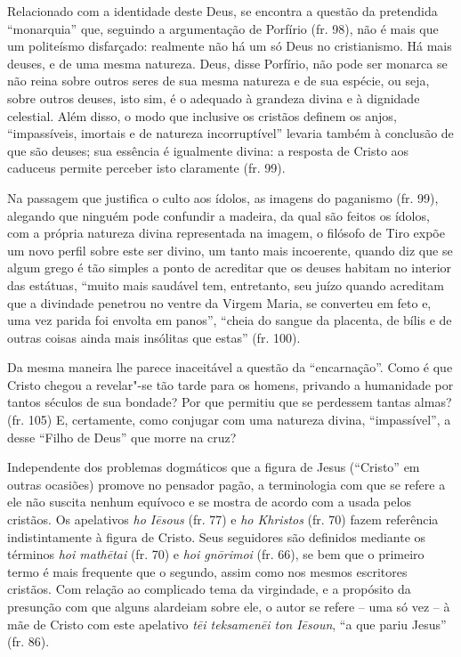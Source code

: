 Relacionado com a identidade deste Deus, se encontra a questão da
pretendida “monarquia” que, seguindo a argumentação de Porfírio (fr.
98), não é mais que um politeísmo disfarçado: realmente não há um só
Deus no cristianismo. Há mais deuses, e de uma mesma natureza. Deus,
disse Porfírio, não pode ser monarca se não reina sobre outros seres de
sua mesma natureza e de sua espécie, ou seja, sobre outros deuses, isto
sim, é o adequado à grandeza divina e à dignidade celestial. Além
disso, o modo que inclusive os cristãos definem os anjos, “impassíveis,
imortais e de natureza incorruptível”
levaria também  à conclusão de que são deuses; sua essência é igualmente
divina: a resposta de Cristo aos caduceus permite perceber isto
claramente (fr. 99). 

Na passagem que justifica o culto aos ídolos, as imagens do paganismo
(fr. 99), alegando que ninguém pode confundir a madeira, da qual são
feitos os ídolos, com a própria natureza divina representada na imagem,
o filósofo de Tiro expõe um novo perfil sobre este ser divino, um tanto
mais incoerente, quando diz que se algum grego é tão simples a ponto de
acreditar que os deuses habitam no interior das estátuas, “muito mais
saudável tem, entretanto, seu juízo quando acreditam que a divindade
penetrou no ventre da Virgem Maria, se converteu em feto e, uma vez
parida foi envolta em panos”,
“cheia do sangue da placenta, de bílis e de outras coisas ainda mais
insólitas que estas” (fr. 100).  

Da mesma maneira lhe parece inaceitável a questão da “encarnação”. Como
é que Cristo chegou a revelar"-se tão tarde para os homens, privando a
humanidade por tantos séculos de sua bondade? Por que permitiu que se
perdessem tantas almas? (fr. 105) E, certamente, como conjugar com uma
natureza divina, “impassível”, a desse “Filho de Deus” que morre na cruz?

Independente dos problemas dogmáticos que a figura de Jesus (“Cristo” em
outras ocasiões) promove no pensador pagão, a terminologia com que se
refere a ele não suscita nenhum equívoco e se mostra de acordo com a
usada pelos cristãos. Os apelativos \textit{ho Iēsous} (fr.
77) e \textit{ho Khristos}
(fr.
70) fazem referência indistintamente à figura de Cristo. Seus
seguidores são definidos mediante os términos \textit{hoi mathētai}
(fr. 70) e \textit{hoi gnōrimoi} (fr.
66), se bem que o primeiro termo é mais frequente que o segundo, assim
como nos mesmos escritores cristãos. Com relação ao complicado tema da
virgindade, e a propósito da presunção com que alguns alardeiam sobre
ele, o autor se refere – uma só vez -- à mãe de Cristo com este apelativo
\textit{tēi teksamenēi ton Iēsoun}, 
“a que pariu Jesus” (fr. 86). 

